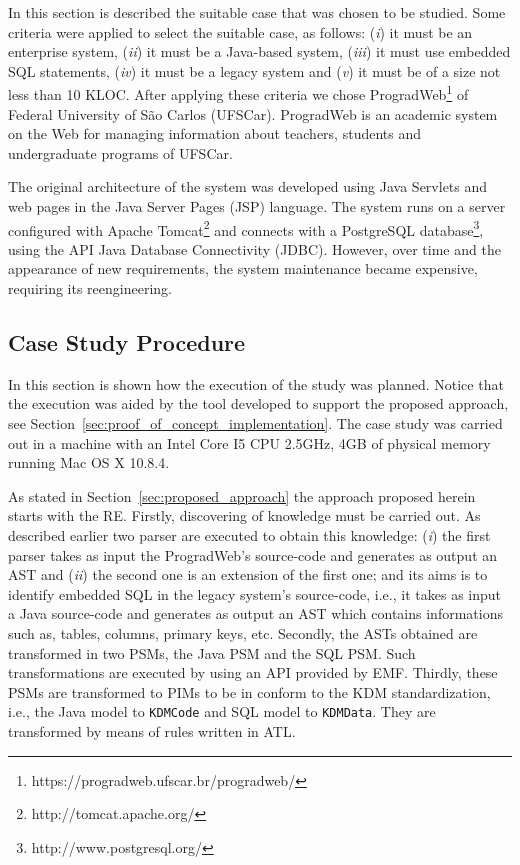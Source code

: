 \documentclass[a4paper,twoside]{article}
\begin{document}
In this section is described the suitable case that was chosen to be studied. Some criteria were applied to select the suitable case, as follows: (\textit{i}) it must be an enterprise system, (\textit{ii}) it must be a Java-based system, (\textit{iii}) it must use embedded SQL statements, (\textit{iv}) it must be a legacy system and (\textit{v}) it must be of a size not less than 10 KLOC. After applying these criteria we chose ProgradWeb\footnote{https://progradweb.ufscar.br/progradweb/} of Federal University of S\~ao Carlos (UFSCar). ProgradWeb is an academic system on the Web for managing information about teachers, students and undergraduate programs of UFSCar. 

The original architecture of the system was developed using Java Servlets and web pages in the Java Server Pages (JSP) language. The system runs on a server configured with Apache Tomcat\footnote{http://tomcat.apache.org/} and connects with a PostgreSQL database\footnote{http://www.postgresql.org/}, using the API Java Database Connectivity (JDBC). However, over time and the appearance of new requirements, the system maintenance became expensive, requiring its reengineering.

\subsection{Case Study Procedure} %
\label{sub:case_study_procedure}

In this section is shown how the execution of the study was planned. Notice that the execution was aided by the tool developed to support the proposed approach, see Section~\ref{sec:proof_of_concept_implementation}. The case study was carried out in a machine with an Intel Core I5 CPU 2.5GHz, 4GB of physical memory running Mac OS X 10.8.4. 

As stated in Section~\ref{sec:proposed_approach} the approach proposed herein starts with the RE. Firstly, discovering of knowledge must be carried out. As described earlier two parser are executed to obtain this knowledge: (\textit{i}) the first parser takes as input the ProgradWeb's source-code and generates as output an AST and (\textit{ii}) the second one is an extension of the first one; and its aims is to identify embedded SQL in the legacy system's source-code, i.e., it takes as input a Java source-code and generates as output an AST which contains informations such as, tables, columns, primary keys, etc. Secondly, the ASTs obtained are transformed in two PSMs, the Java PSM and the SQL PSM. Such transformations are executed by using an API provided by EMF. Thirdly, these PSMs are transformed to PIMs to be in conform to the KDM standardization, i.e., the Java model to \texttt{KDMCode} and SQL model to \texttt{KDMData}. They are transformed by means of rules written in ATL. 
\end{document}
